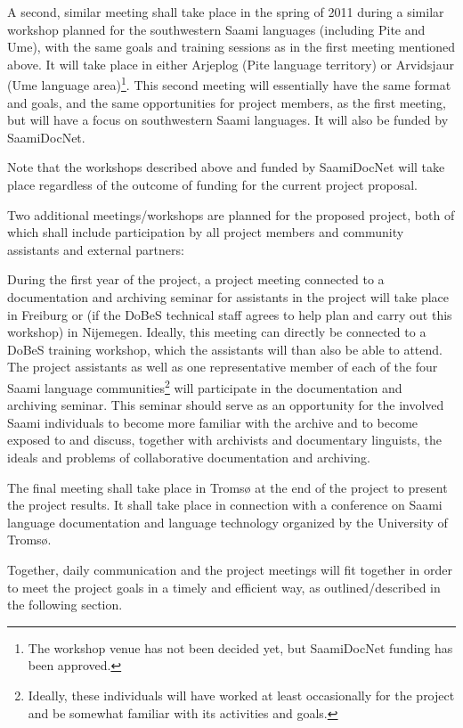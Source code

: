 \documentclass[a4paper,12pt]{article}
\begin{document}
{{{{A second, similar meeting shall take place in the spring of 2011 during a similar workshop planned for the southwestern Saami languages (including Pite and Ume), with the same goals and training sessions as in the first meeting mentioned above. It will take place in either Arjeplog (Pite language territory) or Arvidsjaur (Ume language area)\footnote{The workshop venue has not been decided yet, but SaamiDocNet funding has been approved.}. This second meeting will essentially have the same format and goals, and the same opportunities for project members, as the first meeting, but will have a focus on southwestern Saami languages. It will also be funded by SaamiDocNet.

Note that the workshops described above and funded by SaamiDocNet will take place regardless of the outcome of funding for the current project proposal.

Two additional meetings/workshops are planned for the proposed project, both of which shall include participation by all project members and community assistants and external partners:%

During the first year of the project, a project meeting connected to a documentation and archiving seminar for assistants in the project will take place in Freiburg or (if the DoBeS technical staff agrees to help plan and carry out this workshop) in Nijemegen. Ideally, this meeting can directly be connected to a DoBeS training workshop, which the assistants will than also be able to attend. The project assistants as well as one representative member of each of the four Saami language communities\footnote{Ideally, these individuals will have worked at least occasionally for the project and be somewhat familiar with its activities and goals.} will participate in the documentation and archiving seminar. This seminar should serve as an opportunity for the involved Saami individuals to become more familiar with the archive and to become exposed to and discuss, together with archivists and documentary linguists, the ideals and problems of collaborative documentation and archiving.%

The final meeting shall take place in Tromsø at the end of the project to present the project results. It shall take place in connection with a conference on Saami language documentation and language technology organized by the University of Tromsø.

Together, daily communication and the project meetings will fit together in order to meet the project goals in a timely and efficient way, as outlined/described in the following section.

}}}}
\end{document}
